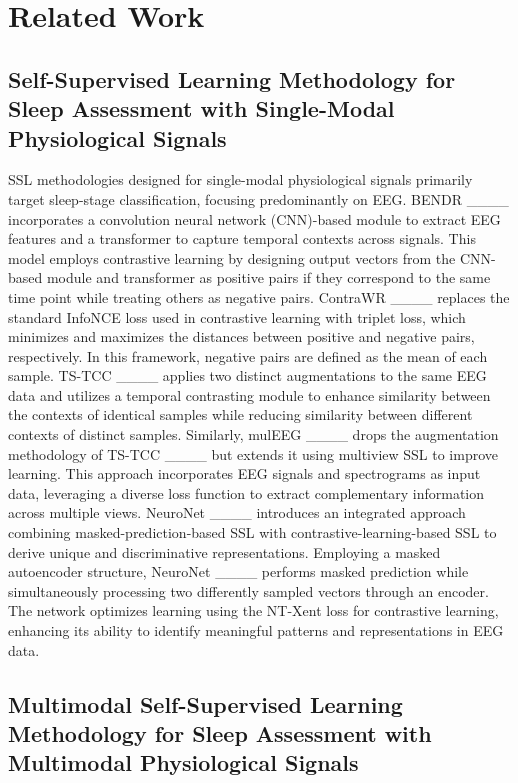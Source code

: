 \section{Related Work}
\subsection{Self-Supervised Learning Methodology for Sleep Assessment with Single-Modal Physiological Signals}

SSL methodologies designed for single-modal physiological signals primarily target sleep-stage classification, focusing predominantly on EEG. BENDR ____ incorporates a convolution neural network (CNN)-based module to extract EEG features and a transformer to capture temporal contexts across signals. This model employs contrastive learning by designing output vectors from the CNN-based module and transformer as positive pairs if they correspond to the same time point while treating others as negative pairs. ContraWR ____ replaces the standard InfoNCE loss used in contrastive learning with triplet loss, which minimizes and maximizes the distances between positive and negative pairs, respectively. In this framework, negative pairs are defined as the mean of each sample. TS-TCC ____ applies two distinct augmentations to the same EEG data and utilizes a temporal contrasting module to enhance similarity between the contexts of identical samples while reducing similarity between different contexts of distinct samples. Similarly, mulEEG ____ drops the augmentation methodology of TS-TCC ____ but extends it using multiview SSL to improve learning. This approach incorporates EEG signals and spectrograms as input data, leveraging a diverse loss function to extract complementary information across multiple views. NeuroNet ____ introduces an integrated approach combining masked-prediction-based SSL with contrastive-learning-based SSL to derive unique and discriminative representations. Employing a masked autoencoder structure, NeuroNet ____ performs masked prediction while simultaneously processing two differently sampled vectors through an encoder. The network optimizes learning using the NT-Xent loss for contrastive learning, enhancing its ability to identify meaningful patterns and representations in EEG data.


\subsection{Multimodal Self-Supervised Learning Methodology for Sleep Assessment with Multimodal Physiological Signals}


